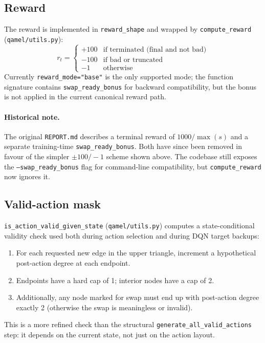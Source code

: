 \documentclass[11pt]{article}
\newcommand{\code}[1]{\texttt{#1}}
\newcommand{\file}[1]{\texttt{\small #1}}
\begin{document}
\subsection{Reward}
The reward is implemented in \code{reward\_shape} and wrapped by \code{compute\_reward} (\file{qamel/utils.py}):
\begin{equation*}
r_t = \begin{cases}
+100 & \text{if terminated (final and not bad)} \\
-100 & \text{if bad or truncated} \\
-1   & \text{otherwise}
\end{cases}
\end{equation*}
Currently \code{reward\_mode="base"} is the only supported mode; the function signature contains \code{swap\_ready\_bonus} for backward compatibility, but the bonus is not applied in the current canonical reward path.

\paragraph{Historical note.} The original \code{REPORT.md} describes a terminal reward of $1000/\max(s)$ and a separate training-time \code{swap\_ready\_bonus}. Both have since been removed in favour of the simpler $\pm 100/-1$ scheme shown above. The codebase still exposes the \code{--swap\_ready\_bonus} flag for command-line compatibility, but \code{compute\_reward} now ignores it.

\subsection{Valid-action mask}
\code{is\_action\_valid\_given\_state} (\file{qamel/utils.py}) computes a state-conditional validity check used both during action selection and during DQN target backups:
\begin{enumerate}
  \item For each requested new edge in the upper triangle, increment a hypothetical post-action degree at each endpoint.
  \item Endpoints have a hard cap of 1; interior nodes have a cap of 2.
  \item Additionally, any node marked for swap must end up with post-action degree exactly 2 (otherwise the swap is meaningless or invalid).
\end{enumerate}
This is a more refined check than the structural \code{generate\_all\_valid\_actions} step: it depends on the current state, not just on the action layout.
\end{document}
